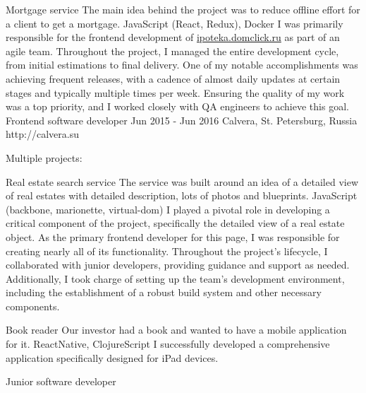 \documentclass[11pt,a4paper,sans]{awesomecv}
\begin{document}
\begin{cventries}
{      \cvproject
          {Mortgage service}
          {}
          {The main idea behind the project was to reduce offline effort for a client to get a mortgage.}
          {JavaScript (React, Redux), Docker}
          {
            I was primarily responsible for the frontend development 
            of \href{http://ipoteka.domclick.ru}{ipoteka.domclick.ru} 
            as part of an agile team. Throughout the project, 
            I managed the entire development cycle, from initial estimations 
            to final delivery. One of my notable accomplishments was achieving 
            frequent releases, with a cadence of almost daily updates at 
            certain stages and typically multiple times per week. 
            Ensuring the quality of my work was a top priority, and I worked 
            closely with QA engineers to achieve this goal.
          }
    }
\cventry
    {Frontend software developer}
    {Jun 2015 - Jun 2016}
    {Calvera, St. Petersburg, Russia}
    {http://calvera.su}
    {
      Multiple projects:\newline
      \begin{cvprojects}{0.8ex}
        \item \cvproject
            {Real estate search service}
            {}
            {The service was built around an idea of a detailed view of real estates with detailed description, lots of photos and blueprints.}
            {JavaScript (backbone, marionette, virtual-dom)}
            {
              I played a pivotal role in developing a critical component 
              of the project, specifically the detailed view of a real estate 
              object. As the primary frontend developer for this page, I was 
              responsible for creating nearly all of its functionality. 
              Throughout the project's lifecycle, I collaborated with junior developers, 
              providing guidance and support as needed. 
              Additionally, I took charge of setting up the team's development environment, 
              including the establishment of a robust build system and other necessary components.
            }
        \item \cvproject
            {Book reader}
            {}
            {Our investor had a book and wanted to have a mobile application for it.}
            {ReactNative, ClojureScript}
            {I successfully developed a comprehensive application specifically designed for iPad devices.}
      \end{cvprojects}
    }
\cventry
    {Junior software developer}

\end{cventries}
\end{document}
